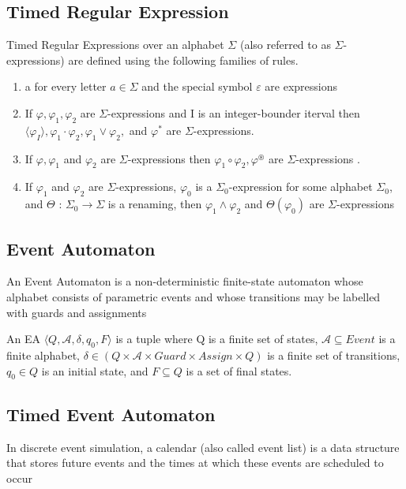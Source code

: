 		\subsection{Timed Regular Expression}
			\begin{dfn}
				Timed Regular Expressions over an alphabet $\Sigma$ (also referred to as $\Sigma$-expressions)
				are defined using the following families of rules.
				\begin{enumerate}
					\item{a for every letter $a \in \Sigma$ and the special symbol $\varepsilon$ are expressions}
					\item{If $\varphi, \varphi_1, \varphi_2$ are $\Sigma$-expressions and I is an integer-bounder iterval then
					$\langle\varphi_I\rangle, \varphi_1 \cdot \varphi_2, \varphi_1 \vee \varphi_2,$ and $\varphi^\ast$ are $\Sigma$-expressions.}
					\item{If $\varphi, \varphi_1$ and $\varphi_2$ are $\Sigma$-expressions then $\varphi_1 \circ \varphi_2, \varphi^\circledast$ are
					$\Sigma$-expressions}
.					\item{If $\varphi_1$ and $\varphi_2$ are $\Sigma$-expressions, $\varphi_0$ is a $\Sigma_0$-expression
					for some alphabet $\Sigma_0$, and $\Theta$ : $\Sigma_0 \rightarrow \Sigma$ is
					a renaming, then $\varphi_1 \wedge \varphi_2$ and $\Theta(\varphi_0)$ are $\Sigma$-expressions}
				\end{enumerate}
			\end{dfn}
			
		
		\subsection{Event Automaton}
			An Event Automaton is a non-deterministic finite-state automaton whose alphabet consists
			of parametric events and whose transitions may be labelled with guards and assignments
			
			\begin{dfn}
				An EA
				$\langle Q,\mathcal{A},\delta, q_0, F \rangle$ is a tuple where Q is a finite set of states, 
				$\mathcal{A} \subseteq Event$ is a finite alphabet,
				$\delta \in (Q \times \mathcal{A} \times Guard \times Assign \times Q)$ is a finite set of transitions, 
				$q_0 \in Q$ is an initial state, and 
				$F \subseteq Q$ is a set of final states.
			\end{dfn}
			
		\subsection{Timed Event Automaton}
			In discrete event simulation, a calendar (also called event list) is a data structure that
			stores future events and the times at which these events are scheduled to occur
			
